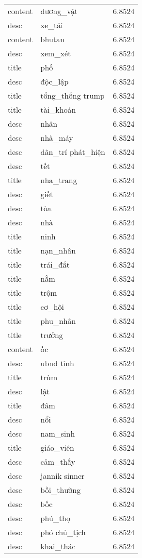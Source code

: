 \documentclass{article}
\begin{document}
\begin{tabular}{lll}
content & dương\_vật & 6.8524\\
desc & xe\_tải & 6.8524\\
content & bhutan & 6.8524\\
desc & xem\_xét & 6.8524\\
title & phố & 6.8524\\
desc & độc\_lập & 6.8524\\
title & tổng\_thống trump & 6.8524\\
title & tài\_khoản & 6.8524\\
desc & nhân & 6.8524\\
desc & nhà\_máy & 6.8524\\
desc & dân\_trí phát\_hiện & 6.8524\\
desc & tết & 6.8524\\
title & nha\_trang & 6.8524\\
desc & giết & 6.8524\\
desc & tỏa & 6.8524\\
desc & nhà & 6.8524\\
title & ninh & 6.8524\\
title & nạn\_nhân & 6.8524\\
title & trái\_đất & 6.8524\\
title & nằm & 6.8524\\
title & trộm & 6.8524\\
title & cơ\_hội & 6.8524\\
title & phu\_nhân & 6.8524\\
title & trưởng & 6.8524\\
content & ốc & 6.8524\\
desc & ubnd tỉnh & 6.8524\\
title & trùm & 6.8524\\
desc & lật & 6.8524\\
title & đâm & 6.8524\\
desc & nổi & 6.8524\\
desc & nam\_sinh & 6.8524\\
title & giáo\_viên & 6.8524\\
desc & cảm\_thấy & 6.8524\\
desc & jannik sinner & 6.8524\\
desc & bồi\_thường & 6.8524\\
desc & bốc & 6.8524\\
desc & phú\_thọ & 6.8524\\
desc & phó chủ\_tịch & 6.8524\\
desc & khai\_thác & 6.8524\\

\end{tabular}
\end{document}
